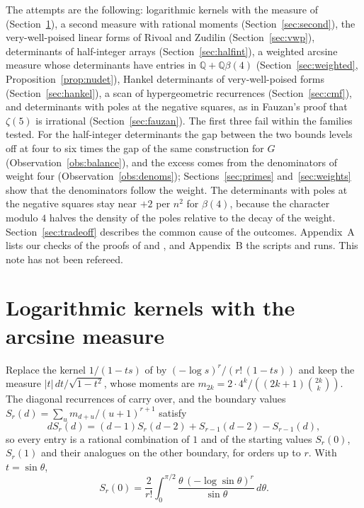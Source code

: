 \documentclass[11pt]{article}
\theoremstyle{definition}
\begin{document}
The attempts are the following: logarithmic kernels with the measure of \cite{OAI} (Section~\ref{sec:logker}), a second measure with rational moments (Section~\ref{sec:second}), the very-well-poised linear forms of Rivoal and Zudilin \cite{RZ} (Section~\ref{sec:vwp}), determinants of half-integer arrays (Section~\ref{sec:halfint}), a weighted arcsine measure whose determinants have entries in $\mathbb Q+\mathbb Q\beta(4)$ (Section~\ref{sec:weighted}, Proposition~\ref{prop:nudet}), Hankel determinants of very-well-poised forms (Section~\ref{sec:hankel}), a scan of hypergeometric recurrences (Section~\ref{sec:cmf}), and determinants with poles at the negative squares, as in Fauzan's proof that $\zeta(5)$ is irrational \cite{Fauzan} (Section~\ref{sec:fauzan}). The first three fail within the families tested. For the half-integer determinants the gap between the two bounds levels off at four to six times the gap of the same construction for $G$ (Observation~\ref{obs:balance}), and the excess comes from the denominators of weight four (Observation~\ref{obs:denoms}); Sections~\ref{sec:primes} and~\ref{sec:weights} show that the denominators follow the weight. The determinants with poles at the negative squares stay near $+2$ per $n^2$ for $\beta(4)$, because the character modulo $4$ halves the density of the poles relative to the decay of the weight. Section~\ref{sec:tradeoff} describes the common cause of the outcomes. Appendix~A lists our checks of the proofs of \cite{Fauzan} and \cite{Lai}, and Appendix~B the scripts and runs. This note has not been refereed.

\section{Logarithmic kernels with the arcsine measure}\label{sec:logker}

Replace the kernel $1/(1-ts)$ of \cite[Eq.~(6)]{OAI} by $(-\log s)^r/(r!\,(1-ts))$ and keep the measure $|t|\,dt/\sqrt{1-t^2}$, whose moments are $m_{2k}=2\cdot4^k/((2k+1)\binom{2k}{k})$. The diagonal recurrences of \cite[Sec.~2.1]{OAI} carry over, and the boundary values $S_r(d)=\sum_u m_{d+u}/(u+1)^{r+1}$ satisfy
\[
dS_r(d)=(d-1)S_r(d-2)+S_{r-1}(d-2)-S_{r-1}(d),
\]
so every entry is a rational combination of $1$ and of the starting values $S_r(0)$, $S_r(1)$ and their analogues on the other boundary, for orders up to $r$. With $t=\sin\theta$,
\[
S_r(0)=\frac{2}{r!}\int_0^{\pi/2}\frac{\theta\,(-\log\sin\theta)^r}{\sin\theta}\,d\theta .
\]
\end{document}
